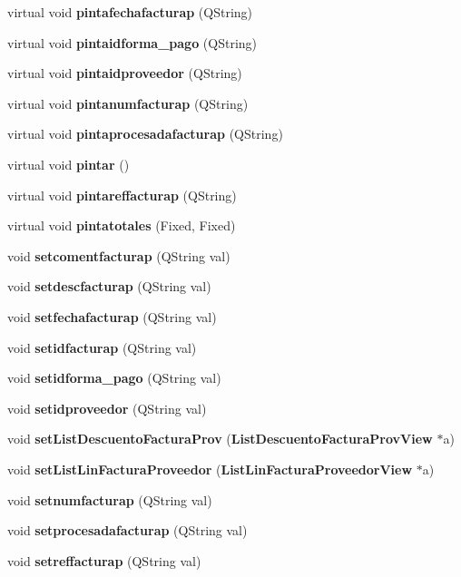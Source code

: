 \begin{CompactItemize}
\item 
virtual void {\bf pintafechafacturap} (QString)\label{classFacturaProveedor_a13}

\item 
virtual void {\bf pintaidforma\_\-pago} (QString)\label{classFacturaProveedor_a14}

\item 
virtual void {\bf pintaidproveedor} (QString)\label{classFacturaProveedor_a15}

\item 
virtual void {\bf pintanumfacturap} (QString)\label{classFacturaProveedor_a16}

\item 
virtual void {\bf pintaprocesadafacturap} (QString)\label{classFacturaProveedor_a17}

\item 
virtual void {\bf pintar} ()\label{classFacturaProveedor_a18}

\item 
virtual void {\bf pintareffacturap} (QString)\label{classFacturaProveedor_a19}

\item 
virtual void {\bf pintatotales} (Fixed, Fixed)\label{classFacturaProveedor_a20}

\item 
void {\bf setcomentfacturap} (QString val)\label{classFacturaProveedor_a21}

\item 
void {\bf setdescfacturap} (QString val)\label{classFacturaProveedor_a22}

\item 
void {\bf setfechafacturap} (QString val)\label{classFacturaProveedor_a23}

\item 
void {\bf setidfacturap} (QString val)\label{classFacturaProveedor_a24}

\item 
void {\bf setidforma\_\-pago} (QString val)\label{classFacturaProveedor_a25}

\item 
void {\bf setidproveedor} (QString val)\label{classFacturaProveedor_a26}

\item 
void {\bf set\-List\-Descuento\-Factura\-Prov} ({\bf List\-Descuento\-Factura\-Prov\-View} $\ast$a)\label{classFacturaProveedor_a27}

\item 
void {\bf set\-List\-Lin\-Factura\-Proveedor} ({\bf List\-Lin\-Factura\-Proveedor\-View} $\ast$a)
\item 
void {\bf setnumfacturap} (QString val)\label{classFacturaProveedor_a29}

\item 
void {\bf setprocesadafacturap} (QString val)\label{classFacturaProveedor_a30}

\item 
void {\bf setreffacturap} (QString val)\label{classFacturaProveedor_a31}

\end{CompactItemize}
